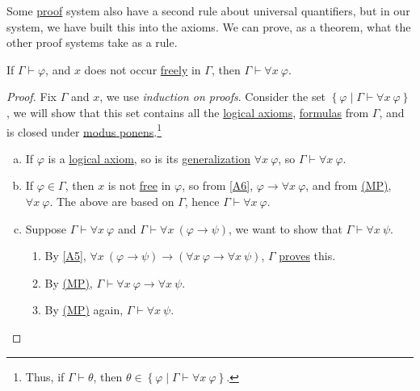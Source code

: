 Some \hyperref[def:proof]{proof} system also have a second rule about universal quantifiers, but in our system, we have built this into the axioms. We can prove, as a theorem, what the other proof systems take as a rule.

\begin{theorem}
	If \(\Gamma \vdash \varphi \), and \(x\) does not occur \hyperref[def:free-variable]{freely} in \(\Gamma \), then \(\Gamma \vdash \forall x\ \varphi \).
\end{theorem}
\begin{proof}
	Fix \(\Gamma \) and \(x\), we use \emph{induction on proofs}. Consider the set \(\left\{ \varphi \mid \Gamma \vdash \forall x\ \varphi \right\} \), we will show that this set contains all the \hyperref[def:logical-axioms]{logical axioms}, \hyperref[def:formula]{formulas} from \(\Gamma \), and is closed under \hyperref[def:rule-of-inference]{modus ponens}.\footnote{Thus, if \(\Gamma \vdash \theta \), then \(\theta \in \left\{ \varphi \mid \Gamma \vdash \forall x\ \varphi \right\} \).}
	\begin{enumerate}[(a)]
		\item If \(\varphi \) is a \hyperref[def:logical-axioms]{logical axiom}, so is its \hyperref[def:generalization]{generalization} \(\forall x\ \varphi \), so \(\Gamma \vdash \forall x\ \varphi \).
		\item If \(\varphi \in \Gamma \), then \(x\) is not \hyperref[def:free-variable]{free} in \(\varphi \), so from \autoref{A6}, \(\varphi \to \forall x\ \varphi \), and from  \hyperref[def:rule-of-inference]{(MP)}, \(\forall x\ \varphi \). The above are based on \(\Gamma \), hence \(\Gamma \vdash \forall x\ \varphi \).
		\item Suppose \(\Gamma \vdash \forall x\ \varphi \) and \(\Gamma \vdash \forall x\ (\varphi \to \psi )\), we want to show that \(\Gamma \vdash \forall x\ \psi \).
		      \begin{enumerate}[1.]
			      \item By \autoref{A5}, \(\forall x\ (\varphi \to \psi ) \to  (\forall x\ \varphi \to \forall x\ \psi )\), \(\Gamma \) \hyperref[def:proof]{proves} this.
			      \item By \hyperref[def:rule-of-inference]{(MP)}, \(\Gamma \vdash \forall x\ \varphi \to \forall x\ \psi \).
			      \item By \hyperref[def:rule-of-inference]{(MP)} again, \(\Gamma \vdash \forall x\ \psi \).
		      \end{enumerate}
	\end{enumerate}
\end{proof}

